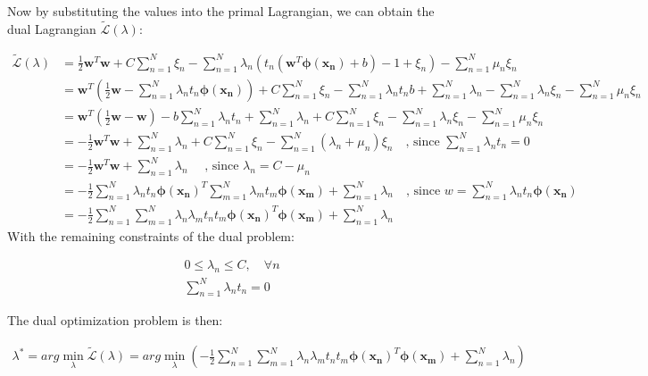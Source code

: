 \documentclass[12pt,a4paper,oneside]{paper}
\begin{document}
Now by substituting the values into the primal Lagrangian, we can obtain the dual Lagrangian $\tilde{\mathcal{L} }(\lambda)$:

\begin{align*}
    \tilde{\mathcal{L} }(\lambda) &= \frac{1}{2} \bm{w}^T \bm{w} + C \sum_{n=1}^{N} \xi_n - \sum_{n=1}^{N} \lambda_n \left( t_n (\bm{w}^T \bm{\phi(x_n)} + b) - 1 + \xi_n \right) - \sum_{n=1}^{N} \mu_n \xi_n \\
    &= \bm{w}^T \left( \frac{1}{2} \bm{w} - \sum_{n=1}^{N} \lambda_n t_n \bm{\phi(x_n)} \right) + C \sum_{n=1}^{N} \xi_n - \sum_{n=1}^{N} \lambda_n t_n b + \sum_{n=1}^{N} \lambda_n - \sum_{n=1}^{N} \lambda_n \xi_n - \sum_{n=1}^{N} \mu_n \xi_n \\
    &= \bm{w}^T \left( \frac{1}{2} \bm{w} - \bm{w} \right) - b \sum_{n=1}^{N} \lambda_n t_n + \sum_{n=1}^{N} \lambda_n + C \sum_{n=1}^{N} \xi_n - \sum_{n=1}^{N} \lambda_n \xi_n - \sum_{n=1}^{N} \mu_n \xi_n \\
    &= -\frac{1}{2} \bm{w}^T \bm{w} + \sum_{n=1}^{N} \lambda_n + C \sum_{n=1}^{N} \xi_n - \sum_{n=1}^{N} (\lambda_n + \mu_n) \xi_n \quad \text{, since $\sum_{n=1}^{N} \lambda_n t_n = 0$} \\
    &= -\frac{1}{2} \bm{w}^T \bm{w} + \sum_{n=1}^{N} \lambda_n \quad \text{ , since $\lambda_n = C - \mu_n$} \\
    &= -\frac{1}{2} \sum_{n=1}^{N} \lambda_n t_n \bm{\phi(x_n)}^T \sum_{m=1}^{N} \lambda_m t_m \bm{\phi(x_m)} + \sum_{n=1}^{N} \lambda_n \quad \text{, since $w = \sum_{n=1}^{N} \lambda_n t_n \bm{\phi(x_n)}$} \\
    &= -\frac{1}{2} \sum_{n=1}^{N} \sum_{m=1}^{N} \lambda_n \lambda_m t_n t_m \bm{\phi(x_n)}^T \bm{\phi(x_m)} + \sum_{n=1}^{N} \lambda_n
\end{align*}
With the remaining constraints of the dual problem:

\begin{align*}
    0 \leq \lambda_n \leq C, \quad \forall n \\
    \sum_{n=1}^{N} \lambda_n t_n = 0
\end{align*}

The dual optimization problem is then:

\begin{align*}
    {\lambda}^* = arg\min_{\lambda} \tilde{\mathcal{L}} (\lambda) = arg\min_{\lambda} \left( -\frac{1}{2} \sum_{n=1}^{N} \sum_{m=1}^{N} \lambda_n \lambda_m t_n t_m \bm{\phi(x_n)}^T \bm{\phi(x_m)} + \sum_{n=1}^{N} \lambda_n \right)
\end{align*}
\end{document}
